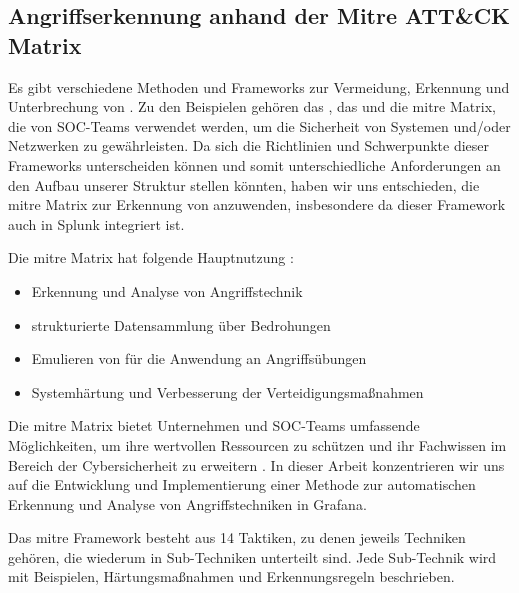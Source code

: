 \subsection{Angriffserkennung anhand der Mitre ATT\&CK Matrix\textregistered}
Es gibt verschiedene Methoden und Frameworks zur Vermeidung, Erkennung und Unterbrechung von . Zu den Beispielen gehören das , das und die \gls{mitre} Matrix, die von \gls{SOC}-Teams verwendet werden, um die Sicherheit von Systemen und/oder Netzwerken zu gewährleisten. Da sich die Richtlinien und Schwerpunkte dieser Frameworks unterscheiden können und somit unterschiedliche Anforderungen an den Aufbau unserer Struktur stellen könnten, haben wir uns entschieden, die \gls{mitre} Matrix zur Erkennung von  anzuwenden, insbesondere da dieser Framework auch in Splunk integriert ist.


Die \gls{mitre} Matrix hat folgende Hauptnutzung \citep{Mitre_Started}:

{
\begin{itemize}[noitemsep]
   \item Erkennung und Analyse von Angriffstechnik
   \item	strukturierte Datensammlung über Bedrohungen
   \item	Emulieren von  für die Anwendung an Angriffsübungen
   \item	Systemhärtung und Verbesserung der Verteidigungsmaßnahmen
\end{itemize}
}

Die \gls{mitre} Matrix bietet Unternehmen und \gls{SOC}-Teams umfassende Möglichkeiten, um ihre wertvollen Ressourcen zu schützen und ihr Fachwissen im Bereich der \gls{Cybersicherheit} zu erweitern \citep{Hazel_howtousemitre}. In dieser Arbeit konzentrieren wir uns auf die Entwicklung und Implementierung einer Methode zur automatischen Erkennung und Analyse von Angriffstechniken in Grafana.

\newpage
Das \gls{mitre} Framework besteht aus 14 Taktiken, zu denen jeweils Techniken gehören, die wiederum in Sub-Techniken unterteilt sind. Jede Sub-Technik wird mit Beispielen, Härtungsmaßnahmen und Erkennungsregeln beschrieben.

